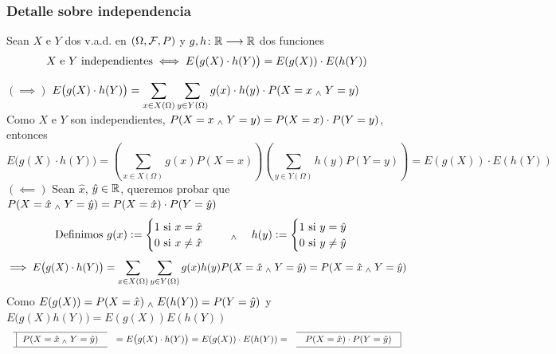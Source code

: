 \subsubsection{Detalle sobre independencia}
\begin{teo}
	Sean $X$ e $Y$ dos v.a.d. en $(\Omega, \mathcal{F}, P)$ y $g,h \colon \mathbb{R} \longrightarrow \mathbb{R}$ dos funciones
	\[X \text{ e } Y \text{ independientes}\iff E\big(g(X)\cdot h(Y)\big)=E(g(X))\cdot E(h(Y))\]
	\begin{dem}
		$(\implies)$ $\displaystyle E\big(g(X)\cdot h(Y)\big) = \sum_{x\in X(\Omega)} \sum_{y\in Y(\Omega)} g(x)\cdot h(y)\cdot P(X=x\; _{\wedge} \; Y=y)$ \\
		Como $X$ e $Y$ son independientes, $P(X=x\; _{\wedge} \; Y=y)=P(X=x)\cdot P(Y=y)$, entonces
		\[E\big(g(X)\cdot h(Y)\big) = \left(\sum_{x\in X(\Omega)} g(x)P(X=x)\right) \left(\sum_{y\in Y(\Omega)} h(y) P(Y=y)\right) = E(g(X))\cdot E(h(Y))\]
		$(\impliedby)$ Sean $\hat{x}$, $\hat{y} \in \mathbb{R}$, queremos probar que $P(X=\hat{x}\; _{\wedge} \; Y=\hat{y})=P(X=\hat{x})\cdot P(Y=\hat{y})$
		\[\text{Definimos } g(x)\vcentcolon=\begin{cases}
				1 \text{ si } x=\hat{x} \\
				0 \text{ si } x\neq\hat{x}
			\end{cases} \quad\; _{\wedge} \;\quad h(y)\vcentcolon=\begin{cases}
				1 \text{ si } y=\hat{y} \\
				0 \text{ si } y\neq\hat{y}
			\end{cases}\]
		\[\implies E\big(g(X)\cdot h(Y)\big) = \sum_{x\in X(\Omega)} \sum_{y\in Y(\Omega)} g(x)h(y)P(X=\hat{x}\; _{\wedge} \; Y=\hat{y})=P(X=\hat{x}\; _{\wedge} \; Y=\hat{y})\]
		Como $E(g(X))=P(X=\hat{x}) \; _{\wedge} \; E(h(Y))=P(Y=\hat{y})$ y
		$E\big(g(X)h(Y)\big)=E(g(X))E(h(Y))$
		\[\lbox{P(X=\hat{x}\we Y=\hat{y})} = E\big(g(X)\cdot h(Y)\big) = E(g(X))\cdot E(h(Y)) = \rbox{P(X=\hat{x})\cdot P(Y=\hat{y})}\]
	\end{dem}
\end{teo}

